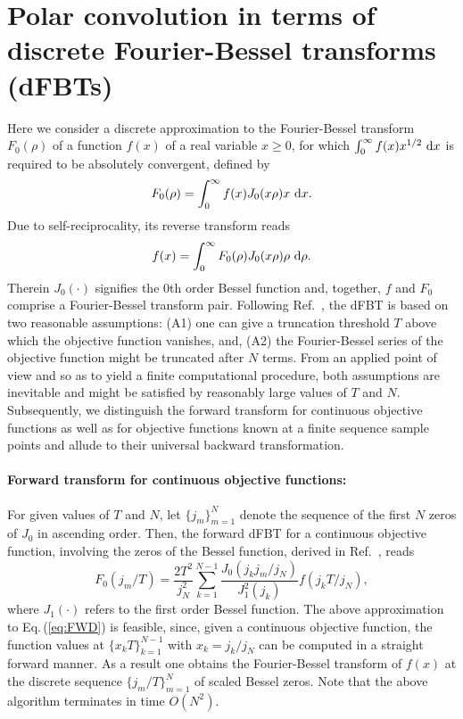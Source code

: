 \documentclass[12pt]{iopart}
\begin{document}
\section{Polar convolution in terms of discrete Fourier-Bessel transforms (dFBTs)}
\label{sec:dFBT}

Here we consider a discrete approximation to the Fourier-Bessel transform
$F_0(\rho)$ of a function $f(x)$ of a real variable $x\geq 0$, for which 
$\int_0^\infty f(x) x^{1/2}~{\rm d}x$ is required to be absolutely 
convergent, defined by 
\cite{Baddour:2009,Baddour:2015} 
\begin{equation}
F_0(\rho) = \int_0^\infty f(x) J_0(x\rho) x~{\rm{d}}x. \label{eq:FWD}
\end{equation}
Due to self-reciprocality, its reverse transform reads
\begin{equation}
f(x) = \int_0^\infty F_0(\rho) J_0(x\rho) \rho~{\rm{d}}\rho. \label{eq:BCKWD}
\end{equation}
Therein $J_0(\cdot)$ signifies the $0$th order Bessel function and, together,
$f$ and $F_0$ comprise a Fourier-Bessel transform pair.  Following
Ref.~\cite{FiskJohnson:1987}, the dFBT is based on two reasonable assumptions:
(A1) one can give a truncation threshold $T$ above which the objective function
vanishes, and, (A2) the Fourier-Bessel series of the objective function might
be truncated after $N$ terms.  From an applied point of view and so as to
yield a finite computational procedure, both assumptions are inevitable
and might be satisfied by reasonably large values of $T$ and $N$.
Subsequently, we distinguish the forward transform for continuous objective
functions as well as for objective functions known at a finite sequence sample
points and allude to their universal backward transformation.

\paragraph{Forward transform for continuous objective functions:}

For given values of $T$ and $N$, let $\{j_m\}_{m=1}^N$ denote the sequence of the
first $N$ zeros of $J_0$ in ascending order. Then, the forward dFBT for a
continuous objective function, involving the zeros of the Bessel function, 
derived in Ref.~\cite{FiskJohnson:1987}, reads
\begin{equation}
F_0(j_m/T) = \frac{2 T^2}{j_N^2} \sum_{k=1}^{N-1} \frac{J_0(j_k j_m/ j_N)}{J_1^2(j_k)} f(j_k T/j_N), \label{eq:dFBTC}
\end{equation}
where $J_1(\cdot)$ refers to the first order Bessel function.  The above
approximation to Eq.\,(\ref{eq:FWD}) is feasible, since, given a continuous
objective function, the function values at $\{x_k T\}_{k=1}^{N-1}$ with
$x_k=j_k/j_N$ can be computed in a straight forward manner. As a result one
obtains the Fourier-Bessel transform of $f(x)$ at the discrete sequence
$\{j_m/T\}_{m=1}^N$ of scaled Bessel zeros.  Note that the above algorithm
terminates in time $O(N^2)$.
\end{document}
